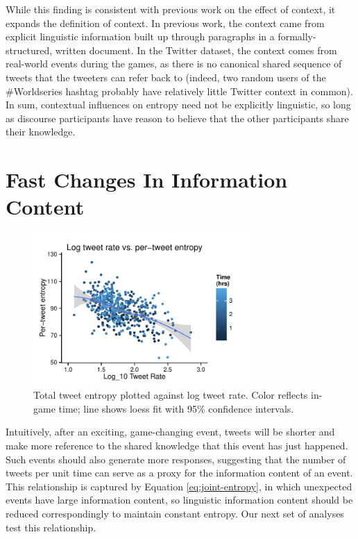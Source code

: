 \documentclass[11pt,letterpaper]{article}
\begin{document}
While this finding is consistent with previous work on the effect of context, it expands the definition of context.  In previous work, the context came from explicit linguistic information built up through paragraphs in a formally-structured, written document.  In the Twitter dataset, the context comes from real-world events during the games, as there is no canonical shared sequence of tweets that the tweeters can refer back to (indeed, two random users of the \#Worldseries hashtag probably have relatively little Twitter context in common).  In sum, contextual influences on entropy need not be explicitly linguistic, so long as discourse participants have reason to believe that the other participants share their knowledge.

\section{Fast Changes In Information Content}

\begin{figure}[h]
 \centering\vspace*{-.75em}
  \includegraphics[width=3.25in]{figures/fig2.pdf}\vspace*{-.7em}
 \caption{Total tweet entropy plotted against log tweet rate. Color reflects in-game time; line shows loess fit with 95\% confidence intervals.}\label{fig:lrate-tent}\vspace*{-.5em}
\end{figure}

Intuitively, after an exciting, game-changing event, tweets will be shorter and make more reference to the shared knowledge that this event has just happened. Such events should also generate more responses, suggesting that the number of tweets per unit time can serve as a proxy for the information content of an event. This relationship is captured by Equation \ref{eq:joint-entropy}, in which unexpected events have large information content, so linguistic information content should be reduced correspondingly to maintain constant entropy. Our next set of analyses test this relationship. 
\end{document}
